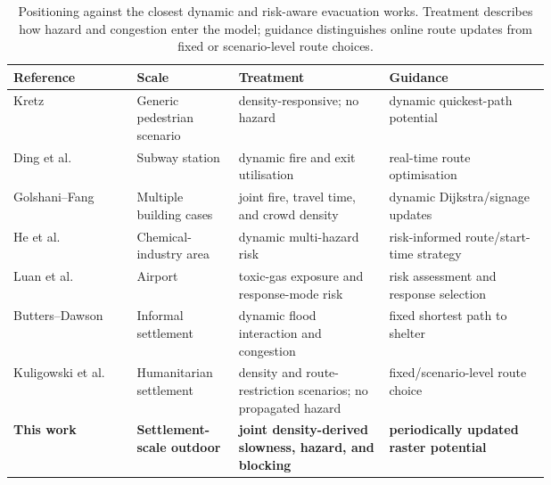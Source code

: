 \documentclass[preprint,12pt]{elsarticle}
\begin{document}
\begin{table}[t]
\centering
\small
\caption{Positioning against the closest dynamic and risk-aware evacuation
works. Treatment describes how hazard and congestion enter the model;
guidance distinguishes online route updates from fixed or scenario-level
route choices.}
\label{tab:comparator}
\begingroup
\setlength{\tabcolsep}{4pt}
\renewcommand{\arraystretch}{1.12}
\begin{tabularx}{\linewidth}{@{}
>{\raggedright\arraybackslash}p{0.23\linewidth}
>{\raggedright\arraybackslash}p{0.19\linewidth}
>{\raggedright\arraybackslash}p{0.28\linewidth}
>{\raggedright\arraybackslash}X@{}}
\toprule
\textbf{Reference} & \textbf{Scale} & \textbf{Treatment} & \textbf{Guidance} \\
\midrule
Kretz~\citeyearpar{Kretz2009DynamicPotential}
    & Generic pedestrian scenario
    & density-responsive; no hazard
    & dynamic quickest-path potential \\
Ding et al.~\citeyearpar{Ding2024BIMFireEvac}
    & Subway station
    & dynamic fire and exit utilisation
    & real-time route optimisation \\
Golshani--Fang~\citeyearpar{Golshani2025FireNavigation}
    & Multiple building cases
    & joint fire, travel time, and crowd density
    & dynamic Dijkstra/signage updates \\
He et al.~\citeyearpar{He2024DynamicMultiHazardEvac}
    & Chemical-industry area
    & dynamic multi-hazard risk
    & risk-informed route/start-time strategy \\
Luan et al.~\citeyearpar{Luan2025ToxicGasAirport}
    & Airport
    & toxic-gas exposure and response-mode risk
    & risk assessment and response selection \\
Butters--Dawson~\citeyearpar{Butters2025Kibera}
    & Informal settlement
    & dynamic flood interaction and congestion
    & fixed shortest path to shelter \\
Kuligowski et al.~\citeyearpar{Kuligowski2025Humanitarian}
    & Humanitarian settlement
    & density and route-restriction scenarios; no propagated hazard
    & fixed/scenario-level route choice \\
\midrule
\textbf{This work} &
\textbf{Settlement-scale outdoor} &
\textbf{joint density-derived slowness, hazard, and blocking} &
\textbf{periodically updated raster potential} \\
\bottomrule
\end{tabularx}
\endgroup
\end{table}
\end{document}
